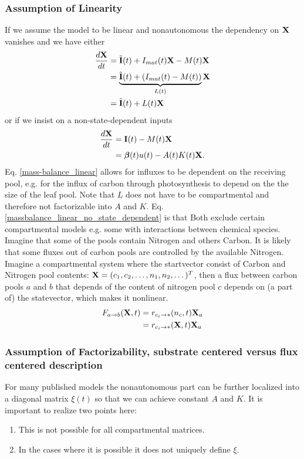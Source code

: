 \subsubsection{Assumption of Linearity}
If we assume the model to be linear and nonautonomous the dependency on $\mathbf{X}$ vanishes and we have
either
\begin{align}
\frac{d \mathbf{X}}{d t}
  &=\tilde{\mathbf{I}}(t)+I_{mat}(t)\mathbf{X} - M(t) \mathbf{X}  \nonumber
  \\
  &=\underbrace{\tilde{\mathbf{I}}(t)+(I_{mat}(t) - M(t))}_{L(t)} \mathbf{X} \label{massbalance_linear} \\
  &=\tilde{\mathbf{I}}(t)+L(t) \mathbf{X} \nonumber
\end{align}
or if we insist on a non-state-dependent inputs 
\begin{align}
\frac{d \mathbf{X}}{d t}
  &=\mathbf{I}(t) - M(t) \mathbf{X} \label{massbalance_linear_no_state_dependent}
  \\
  &= \bm{\beta}(t)u(t) - A(t) K(t) \mathbf{X} \nonumber .
\end{align} 
Eq. \eqref{mass-balance_linear} allows for influxes to be dependent on the receiving pool, e.g. for the influx of carbon through photosynthesis to depend on the the size of the leaf pool. Note that $L$ does not have to be compartmental and therefore not factorizable into $A$ and $K$.
Eq. \eqref{massbalance_linear_no_state_dependent} is that 
Both  exclude certain compartmental models e.g. some with interactions between chemical species. 
Imagine that some of the pools contain Nitrogen and others Carbon.
It is likely that some fluxes out of carbon pools are controlled by the
available Nitrogen.  
Imagine a compartmental system where the startvector
consist of Carbon and Nitrogen pool contents: $\mathbf{X}=(c_1,c_2,\dots,
n_1,n_2,\dots )^T$, then a flux between carbon pools $a$ and $b$ that
depends of the content of nitrogen pool $c$ depends on (a part of) the
statevector, which makes it nonlinear.
\begin{align*}
F_{a \rightarrow b} (\mathbf{X},t)  &= r_{c_i \rightarrow *}(n_c,t) \mathbf{X}_a \\
                            &= r_{c_i \rightarrow *}(\mathbf{X},t) \mathbf{X}_a
\end{align*}


\subsubsection{Assumption of Factorizability, substrate centered versus flux centered description}
For many published models the nonautonomous part  can be further localized into a diagonal matrix $\xi(t)$ so that we can achieve constant $A$ and $K$. It is important to realize two points here:
\begin{enumerate}
\item \label{substrate_xi}
  This is not possible for all compartmental matrices.
\item  \label{define_xi}
  In the cases where it is possible it does not uniquely define $\xi$.
\end{enumerate}

